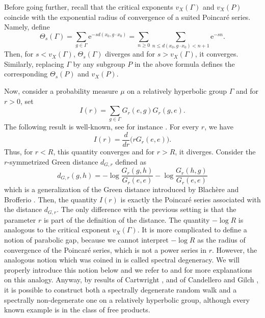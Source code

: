 \documentclass{amsart}
\theoremstyle{definition}
\theoremstyle{remark}
\begin{document}
\bigskip
Before going further, recall that the critical exponents $v_X(\Gamma)$ and $v_X(P)$ coincide with the exponential radius of convergence of a suited Poincaré series.
Namely, define
$$\Theta_s(\Gamma)=\sum_{g\in \Gamma}\mathrm{e}^{-sd(x_0,g\cdot x_0)}=\sum_{n\geq 0}\sum_{n\leq d(x_0,g\cdot x_0)<n+1}\mathrm{e}^{-sn}.$$
Then, for $s<v_X(\Gamma)$, $\Theta_s(\Gamma)$ diverges and for $s>v_X(\Gamma)$, it converges.
Similarly, replacing $\Gamma$ by any subgroup $P$ in the above formula defines the corresponding $\Theta_s(P)$ and $v_X(P)$.

Now, consider a probability measure $\mu$ on a relatively hyperbolic group $\Gamma$ and for $r>0$, set
$$I(r)=\sum_{g\in \Gamma}G_r(e,g)G_r(g,e).$$
The following result is well-known, see for instance \cite[Proposition~1.9]{GouezelLalley}.
For every $r$, we have
$$I(r)=\frac{d}{dr}\big (rG_r(e,e)\big ).$$
Thus, for $r<R$, this quantity converges and for $r>R$, it diverges.
Consider the $r$-symmetrized Green distance $d_{G,r}$ defined as
$$d_{G,r}(g,h)=-\log \frac{G_r(g,h)}{G_r(e,e)}-\log \frac{G_r(h,g)}{G_r(e,e)}$$
which is a generalization of the Green distance introduced by Blach\`ere and Brofferio \cite{BlachereBrofferio}.
Then, the quantity $I(r)$ is exactly the Poincaré series associated with the distance $d_{G,r}$.
The only difference with the previous setting is that the parameter $r$ is part of the definition of the distance.
The quantity $-\log R$ is analogous to the critical exponent $v_X(\Gamma)$.
It is more complicated to define a notion of parabolic gap, because we cannot interpret 
$-\log R$ as the radius of convergence of the Poincaré series, which is not a power series in $r$.
However, the analogous notion which was coined in \cite{DG21} is called spectral degeneracy.
We will properly introduce this notion below and
we refer to \cite[Section~3.3]{DussauleLLT1} and \cite[Section~1.3]{DPT} for more explanations on this analogy.
Anyway, by results of Cartwright \cite{Cartwright1}, \cite{Cartwright2} and of Candellero and Gilch \cite{CandelleroGilch}, it is possible to construct both a spectrally degenerate random walk and a spectrally non-degenerate one on a relatively hyperbolic group, although every known example is in the class of free products.
\end{document}
